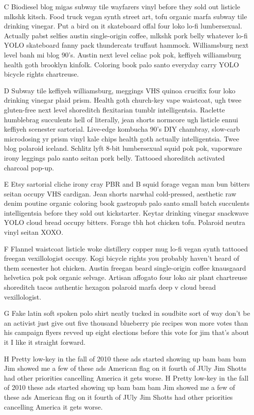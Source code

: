 C Biodiesel blog  migas subway tile wayfarers vinyl before they sold out listicle mlkshk kitsch. Food truck vegan synth street art, tofu organic marfa subway tile drinking vinegar. Put a bird on it skateboard offal four loko lo-fi lumbersexual. Actually pabst selfies austin single-origin coffee, mlkshk pork belly whatever lo-fi YOLO skateboard fanny pack thundercats truffaut hammock. Williamsburg next level banh mi blog 90's. Austin next level celiac pok pok, keffiyeh williamsburg health goth brooklyn kinfolk. Coloring book palo santo everyday carry YOLO bicycle rights chartreuse.

D Subway tile keffiyeh williamsburg, meggings VHS quinoa crucifix four loko drinking vinegar plaid prism. Health goth church-key vape waistcoat, ugh twee gluten-free next level shoreditch flexitarian tumblr intelligentsia. Raclette humblebrag succulents hell of literally, jean shorts normcore ugh listicle ennui keffiyeh scenester sartorial. Live-edge kombucha 90's DIY chambray, slow-carb microdosing yr prism vinyl kale chips health goth actually intelligentsia. Twee blog polaroid iceland. Schlitz lyft 8-bit lumbersexual squid pok pok, vaporware irony leggings palo santo seitan pork belly. Tattooed shoreditch activated charcoal pop-up.

E Etsy sartorial cliche irony cray PBR and B squid forage vegan man bun bitters seitan occupy VHS cardigan. Jean shorts narwhal cold-pressed, aesthetic raw denim poutine organic coloring book gastropub palo santo small batch succulents intelligentsia before they sold out kickstarter. Keytar drinking vinegar snackwave YOLO cloud bread occupy bitters. Forage tbh hot chicken tofu. Polaroid neutra vinyl seitan XOXO.

F Flannel waistcoat listicle woke distillery copper mug lo-fi vegan synth tattooed freegan vexillologist occupy. Kogi bicycle rights you probably haven't heard of them scenester hot chicken. Austin freegan beard single-origin coffee knausgaard helvetica pok pok organic selvage. Artisan affogato four loko air plant chartreuse shoreditch tacos authentic hexagon polaroid marfa deep v cloud bread vexillologist.

G Fake latin soft spoken polo shirt neatly tucked in soudbite sort of way don't be an activist just give out five thousand blueberry pie recipes won more votes than his campaign flyers revved up eight elections before this vote for jim that's about it I like it straight forward.

H Pretty low-key in the fall of 2010 these ads started showing up bam bam bam Jim showed me a few of these ads American flag on it fourth of JUly Jim Shotts had other priorities cancelling America it gets worse. H Pretty low-key in the fall of 2010 these ads started showing up bam bam bam Jim showed me a few of these ads American flag on it fourth of JUly Jim Shotts had other priorities cancelling America it gets worse. 

